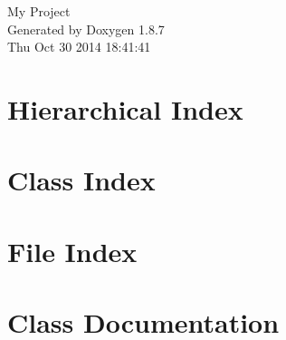 \documentclass[twoside]{book}
\newcommand{\+}{\discretionary{\mbox{\scriptsize$\hookleftarrow$}}{}{}}
\newcommand{\clearemptydoublepage}{%
  \newpage{\pagestyle{empty}\cleardoublepage}%
}
\begin{document}
\hypersetup{pageanchor=false,
             bookmarks=true,
             bookmarksnumbered=true,
             pdfencoding=unicode
            }
\begin{titlepage}
\vspace*{7cm}
\begin{center}%
{\Large My Project }\\
\vspace*{1cm}
{\large Generated by Doxygen 1.8.7}\\
\vspace*{0.5cm}
{\small Thu Oct 30 2014 18:41:41}\\
\end{center}
\end{titlepage}
\clearemptydoublepage
\tableofcontents
\clearemptydoublepage
{}
\hypersetup{pageanchor=true}

\chapter{Hierarchical Index}

\chapter{Class Index}

\chapter{File Index}

\chapter{Class Documentation}



















\end{document}
